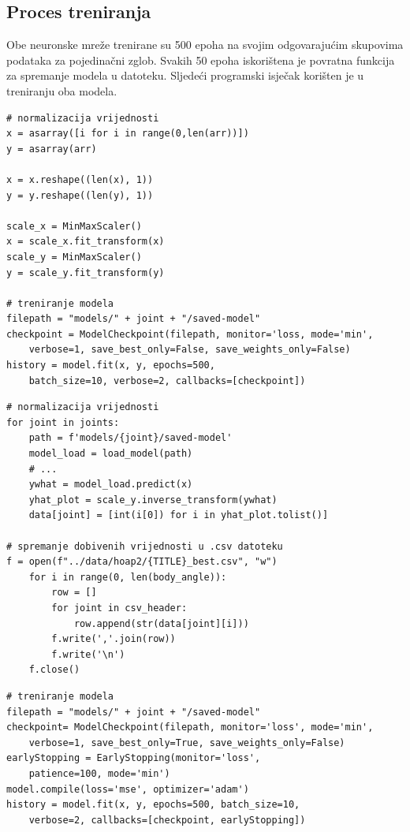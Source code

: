 \documentclass[times, utf8, zavrsni]{fer}
\begin{document}
\subsection{Proces treniranja}
Obe neuronske mreže trenirane su 500 epoha na svojim odgovarajućim skupovima podataka za pojedinačni zglob. Svakih 50 epoha iskorištena je povratna funkcija za spremanje modela u datoteku. Sljedeći programski isječak korišten je u treniranju oba modela.

\begin{verbatim}
# normalizacija vrijednosti
x = asarray([i for i in range(0,len(arr))])
y = asarray(arr)

x = x.reshape((len(x), 1))
y = y.reshape((len(y), 1))

scale_x = MinMaxScaler()
x = scale_x.fit_transform(x)
scale_y = MinMaxScaler()
y = scale_y.fit_transform(y)

# treniranje modela
filepath = "models/" + joint + "/saved-model"
checkpoint = ModelCheckpoint(filepath, monitor='loss, mode='min',
    verbose=1, save_best_only=False, save_weights_only=False)
history = model.fit(x, y, epochs=500, 
    batch_size=10, verbose=2, callbacks=[checkpoint])
\end{verbatim}


\begin{verbatim}
# normalizacija vrijednosti
for joint in joints:
    path = f'models/{joint}/saved-model'
    model_load = load_model(path)
    # ...
    ywhat = model_load.predict(x)
    yhat_plot = scale_y.inverse_transform(ywhat)
    data[joint] = [int(i[0]) for i in yhat_plot.tolist()]

# spremanje dobivenih vrijednosti u .csv datoteku
f = open(f"../data/hoap2/{TITLE}_best.csv", "w")
    for i in range(0, len(body_angle)):
        row = []
        for joint in csv_header:
            row.append(str(data[joint][i]))
        f.write(','.join(row))
        f.write('\n')
    f.close()
\end{verbatim}

\newpage
\begin{verbatim}
# treniranje modela
filepath = "models/" + joint + "/saved-model" 
checkpoint= ModelCheckpoint(filepath, monitor='loss', mode='min', 
    verbose=1, save_best_only=True, save_weights_only=False)
earlyStopping = EarlyStopping(monitor='loss', 
    patience=100, mode='min')
model.compile(loss='mse', optimizer='adam')
history = model.fit(x, y, epochs=500, batch_size=10, 
    verbose=2, callbacks=[checkpoint, earlyStopping])

\end{verbatim}
\end{document}
